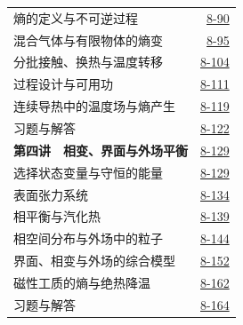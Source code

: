 \begin{longtable}{@{}p{}r@{}}
\hspace{1em}熵的定义与不可逆过程&\href{course-page:8:93}{8-90}\\[2pt]
\hspace{1em}混合气体与有限物体的熵变&\href{course-page:8:98}{8-95}\\[2pt]
\hspace{1em}分批接触、换热与温度转移&\href{course-page:8:107}{8-104}\\[2pt]
\hspace{1em}过程设计与可用功&\href{course-page:8:114}{8-111}\\[2pt]
\hspace{1em}连续导热中的温度场与熵产生&\href{course-page:8:122}{8-119}\\[2pt]
\hspace{1em}习题与解答&\href{course-page:8:125}{8-122}\\[2pt]
\textbf{第四讲　相变、界面与外场平衡}&\href{course-page:8:132}{8-129}\\[2pt]
\hspace{1em}选择状态变量与守恒的能量&\href{course-page:8:132}{8-129}\\[2pt]
\hspace{1em}表面张力系统&\href{course-page:8:137}{8-134}\\[2pt]
\hspace{1em}相平衡与汽化热&\href{course-page:8:142}{8-139}\\[2pt]
\hspace{1em}相空间分布与外场中的粒子&\href{course-page:8:147}{8-144}\\[2pt]
\hspace{1em}界面、相变与外场的综合模型&\href{course-page:8:155}{8-152}\\[2pt]
\hspace{1em}磁性工质的熵与绝热降温&\href{course-page:8:165}{8-162}\\[2pt]
\hspace{1em}习题与解答&\href{course-page:8:167}{8-164}\\[2pt]
\end{longtable}
